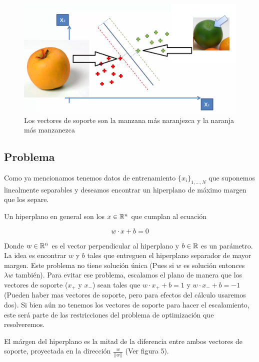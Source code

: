 \begin{figure}[ht]
    \centering
    \includegraphics[scale=0.3]{img/img5.png}
    \caption{Los vectores de soporte son la manzana más naranjezca y la naranja más manzanezca}
    \label{fig:my_label1}
\end{figure}

\subsection{Problema}



Como ya mencionamos tenemos datos de entrenamiento $\{x_i\}_{1,...,N}$ que suponemos linealmente separables y deseamos encontrar un hiperplano de máximo margen que los separe. 

Un hiperplano en general son los $x\in {\mathbb R}^n$ que cumplan al ecuación

\begin{equation}
    w\cdot x + b = 0 
\end{equation}

Donde $w\in {\mathbb R}^n$ es el vector perpendicular al hiperplano y $b\in {\mathbb R}$ es un parámetro. La idea es encontrar $w$ y $b$ tales que entreguen el hiperplano separador de mayor margen. Este problema no tiene solución única (Pues si $w$ es solución entonces $\lambda w$ también). Para evitar ese problema, escalamos el plano de manera que los vectores de soporte ($x_{+}$ y $x_{-}$) sean tales que $w\cdot x_{+} + b = 1$ y $w\cdot x_{-} + b =  -1$ (Pueden haber mas vectores de soporte, pero para efectos del cálculo usaremos dos). Si bien aún no tenemos los vectores de soporte para hacer el escalamiento, este será parte de las restricciones del problema de optimización que resolveremos. 

El márgen del hiperplano es la mitad de la diferencia entre ambos vectores de soporte, proyectada en la dirección $\frac{w}{||w||}$ (Ver figura 5). 

